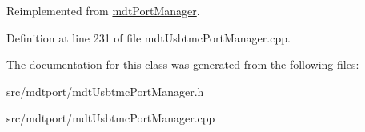 Reimplemented from \hyperlink{classmdt_port_manager_a6d3cc4e522326e2a6ca0da401ae58271}{mdtPortManager}.



Definition at line 231 of file mdtUsbtmcPortManager.cpp.



The documentation for this class was generated from the following files:\begin{DoxyCompactItemize}
\item 
src/mdtport/mdtUsbtmcPortManager.h\item 
src/mdtport/mdtUsbtmcPortManager.cpp\end{DoxyCompactItemize}
